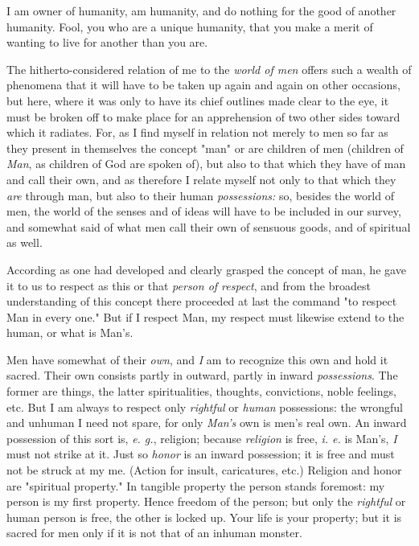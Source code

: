 \documentclass[a4paper]{book}
\begin{document}
I am owner of humanity, am humanity, and do nothing for the good of another 
humanity. Fool, you who are a unique humanity, that you make a merit of 
wanting to live for another than you are.

The hitherto-considered relation of me to the \textit{world of men} offers 
such a wealth of phenomena that it will have to be taken up again and again on 
other occasions, but here, where it was only to have its chief outlines made 
clear to the eye, it must be broken off to make place for an apprehension of 
two other sides toward which it radiates. For, as I find myself in relation 
not merely to men so far as they present in themselves the concept "{}man"{} 
or are children of men (children of \textit{Man}, as children of God are 
spoken of), but also to that which they have of man and call their own, and as 
therefore I relate myself not only to that which they \textit{are} through 
man, but also to their human \textit{possessions:} so, besides the world of 
men, the world of the senses and of ideas will have to be included in our 
survey, and somewhat said of what men call their own of sensuous goods, and of 
spiritual as well.

According as one had developed and clearly grasped the concept of man, he gave 
it to us to respect as this or that \textit{person of respect}, and from the 
broadest understanding of this concept there proceeded at last the command 
"{}to respect Man in every one."{} But if I respect Man, my respect must 
likewise extend to the human, or what is Man's.

Men have somewhat of their \textit{own}, and \textit{I} am to recognize this 
own and hold it sacred. Their own consists partly in outward, partly in inward 
\textit{possessions}. The former are things, the latter spiritualities, 
thoughts, convictions, noble feelings, etc. But I am always to respect only 
\textit{rightful} or \textit{human} possessions: the wrongful and unhuman I 
need not spare, for only \textit{Man's} own is men's real own. An inward 
possession of this sort is, \textit{e. g.}, religion; because 
\textit{religion} is free, \textit{i. e.} is Man's, \textit{I} must not strike 
at it. Just so \textit{honor} is an inward possession; it is free and must not 
be struck at my me. (Action for insult, caricatures, etc.) Religion and honor 
are "{}spiritual property."{} In tangible property the person stands foremost: 
my person is my first property. Hence freedom of the person; but only the 
\textit{rightful} or human person is free, the other is locked up. Your life 
is your property; but it is sacred for men only if it is not that of an 
inhuman monster.
\end{document}
